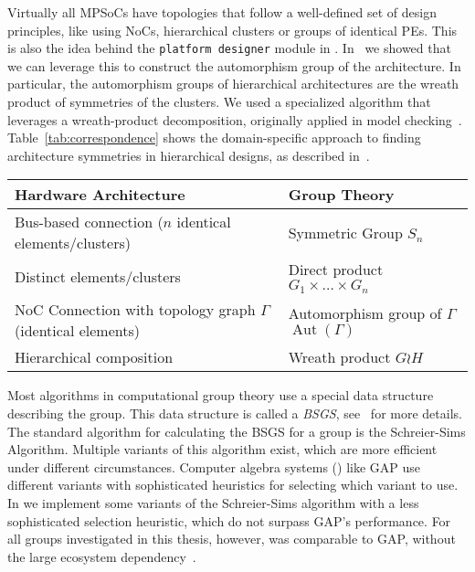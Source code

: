 Virtually all \acp{MPSoC} have topologies that follow a well-defined set of design principles, like using \acp{NoC}, hierarchical clusters or groups of identical \acp{PE}.
This is also the idea behind the \texttt{platform designer} module in \mocasin.
In~\cite{goens_tcad21} we showed that we can leverage this to construct the automorphism group of the architecture.
In particular, the automorphism groups of hierarchical architectures are the wreath product of symmetries of the clusters.
We used a specialized algorithm that leverages a wreath-product decomposition, originally applied in model checking~\cite{donaldson2009constructive}.
Table~\ref{tab:correspondence} shows the domain-specific approach to finding architecture symmetries in hierarchical designs, as described in~\cite{goens_tcad21}.

\begin{table*}[t]
   \caption{Correspondence of architecture and group-theoretic constructions. Adapted from Table~1 in~\cite{goens_tcad21}.}
     \label{tab:correspondence}
   \begin{center}
     \begin{tabularx}{\textwidth}{XX}
       Hardware Architecture & Group Theory \\
       \hline
       \rowcolor{gray!15}
       Bus-based connection ($n$ identical elements/clusters) & Symmetric Group $S_n$ \\
       Distinct elements/clusters & Direct product $G_1 \times \ldots \times G_n$ \\
       \rowcolor{gray!15}
       \ac{NoC} Connection with topology graph $\Gamma$ (identical elements) & Automorphism group of $\Gamma$  $\operatorname{Aut}(\Gamma)$  \\
       Hierarchical composition & Wreath product $G \wr H$ \\
     \end{tabularx}
   \end{center}
   \vspace{-0.5cm}
 \end{table*}
 
Most algorithms in computational group theory use a special data structure describing the group.
This data structure is called a \emph{\ac{BSGS}}, see~\cite{holt,seress2003permutation} for more details.
The standard algorithm for calculating the \ac{BSGS} for a group is the Schreier-Sims Algorithm.
Multiple variants of this algorithm exist, which are more efficient under different circumstances.
Computer algebra systems () like \ac{GAP} use different variants with sophisticated heuristics for selecting which variant to use.
In \mpsym we implement some variants of the Schreier-Sims algorithm with a less sophisticated selection heuristic, which do not surpass \ac{GAP}'s performance.
For all groups investigated in this thesis, however, \mpsym was comparable to \ac{GAP}, without the large ecosystem dependency~\cite{nicolai_studienarbeit,goens_tcad21}.

